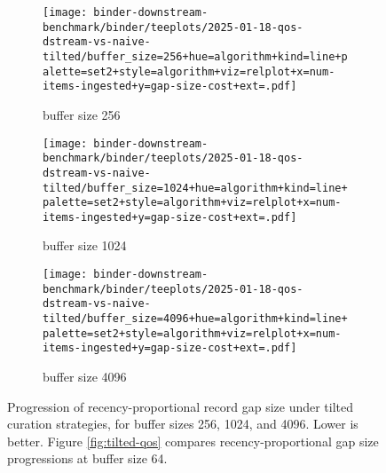 \begin{figure}
\begin{subfigure}{0.6\linewidth}
\texttt{[image: binder-downstream-benchmark/binder/teeplots/2025-01-18-qos-dstream-vs-naive-tilted/buffer\_size=256+hue=algorithm+kind=line+palette=set2+style=algorithm+viz=relplot+x=num-items-ingested+y=gap-size-cost+ext=.pdf]}
\caption{buffer size 256}
\end{subfigure}
\begin{subfigure}{0.6\linewidth}
\texttt{[image: binder-downstream-benchmark/binder/teeplots/2025-01-18-qos-dstream-vs-naive-tilted/buffer\_size=1024+hue=algorithm+kind=line+palette=set2+style=algorithm+viz=relplot+x=num-items-ingested+y=gap-size-cost+ext=.pdf]}
\caption{buffer size 1024}
\end{subfigure}
\begin{subfigure}{0.6\linewidth}
\texttt{[image: binder-downstream-benchmark/binder/teeplots/2025-01-18-qos-dstream-vs-naive-tilted/buffer\_size=4096+hue=algorithm+kind=line+palette=set2+style=algorithm+viz=relplot+x=num-items-ingested+y=gap-size-cost+ext=.pdf]}
\caption{buffer size 4096}
\end{subfigure}
\caption{%
Progression of recency-proportional record gap size under tilted curation strategies, for buffer sizes 256, 1024, and 4096.
\footnotesize
Lower is better.
Figure \ref{fig:tilted-qos} compares recency-proportional gap size progressions at buffer size 64.
}
\label{fig:tilted-qos-supp}
\end{figure}
